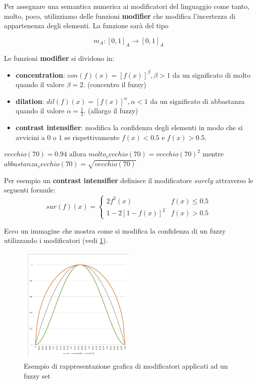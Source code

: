 Per assegnare una semantica numerica ai modificatori del linguaggio come tanto, molto,
poco, utilizziamo delle funzioni \textbf{modifier} che modifica l'incertezza di appartenenza degli 
elementi. La funzione sarà del tipo

$$m_A: [0,1]_A \to [0,1]_A$$

Le funzioni \textbf{modifier} si dividono in:
\begin{itemize}
    \item \textbf{concentration}: $con(f)(x)=[f(x)]^\beta, \beta>1$ da un significato di molto 
    quando il valore $\beta =2$. (concentro il fuzzy)
    \item \textbf{dilation}:  $dil(f)(x)=[f(x)]^\alpha, \alpha <1$ da un significato di abbastanza
    quando il valore $\alpha =\frac{1}{2}$. (allargo il fuzzy)
    \item \textbf{contrast intensifier}: modifica la confidenza degli elementi in modo 
    che si avvicini a $0$ o $1$ se rispettivamente $f(x)< 0.5$ e $f(x) >0.5$.
\end{itemize}

\begin{esempio}
    $vecchio(70)=0.94$ allora $molto_vecchio (70) = vecchio(70)^2$
    mentre $abbastanza_vecchio (70) = \sqrt{vecchio(70)}$
\end{esempio}

\begin{esempio}
    Per esempio un \textbf{contrast intensifier} definisce il modificatore $surely$
    attraverso le seguenti formule:
    $$sur(f)(x)=\begin{cases}
        2f^2(x) & f(x) \le 0.5\\
        1-2[1-f(x)]^2 & f(x) > 0.5
    \end{cases}$$
\end{esempio}

Ecco un immagine che mostra come si modifica la confidenza di un fuzzy utilizzando 
i modificatori (vedi \ref{fig:modificatori_fuzzy_set}).

\begin{figure}[!h]
    \centering
    \includegraphics[width=0.5\textwidth]{img/sistemi_incerti/modificatori_fuzzy.png}
    \caption{Esempio di rappresentazione grafica di modificatori applicati ad un fuzzy set}
    \label{fig:modificatori_fuzzy_set}
\end{figure}  

